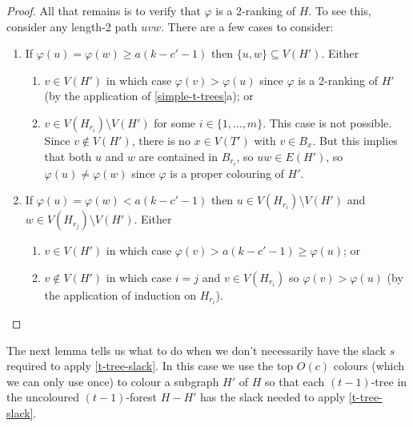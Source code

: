 \documentclass[kpfonts]{patmorin}
\theoremstyle{named}
\newcommand{\weirdref}[2]{\cref{#1}#2}
\begin{document}
\begin{proof}
   All that remains is to verify that $\varphi$ is a 2-ranking of $H$. To see this, consider any length-2 path $uvw$.  There are a few cases to consider:
   \begin{enumerate}
    \item If $\varphi(u)=\varphi(w) \ge a(k-c'-1)$ then $\{u,w\}\subseteq V(H')$. Either
    \begin{enumerate}
       \item $v\in V(H')$ in which case $\varphi(v)>\varphi(u)$ since $\varphi$ is a 2-ranking of $H'$ (by the application of \weirdref{simple-t-trees}{a}); or
       \item $v\in V(H_{r_i})\setminus V(H')$ for some $i\in\{1,\ldots,m\}$.  This case is not possible.  Since $v\not\in V(H')$, there is no $x\in V(T')$ with $v\in B_x$.  But this implies that both $u$ and $w$ are contained in $B_{r_i}$, so $uw\in E(H')$, so $\varphi(u)\neq\varphi(w)$ since $\varphi$ is a proper colouring of $H'$.
   \end{enumerate}
   \item If $\varphi(u)=\varphi(w) < a(k-c'-1)$ then $u\in V(H_{r_i})\setminus V(H')$ and $w\in V(H_{r_j})\setminus V(H')$.  Either
   \begin{enumerate}
    \item $v\in V(H')$ in which case $\varphi(v)>a(k-c'-1)\ge\varphi(u)$; or
    \item $v\not\in V(H')$ in which case $i=j$ and $v\in V(H_{r_i})$ so $\varphi(v)>\varphi(u)$ (by the application of induction on $H_{r_i}$). \qedhere
    \end{enumerate}
   \end{enumerate}
\end{proof}

The next lemma tells us what to do when we don't necessarily have the slack $s$ required to apply \cref{t-tree-slack}.  In this case we use the top $O(c)$ colours (which we can only use once) to colour a subgraph $H'$ of $H$ so that each $(t-1)$-tree in the uncoloured $(t-1)$-forest $H-H'$ has the slack needed to apply \cref{t-tree-slack}.
\end{document}
